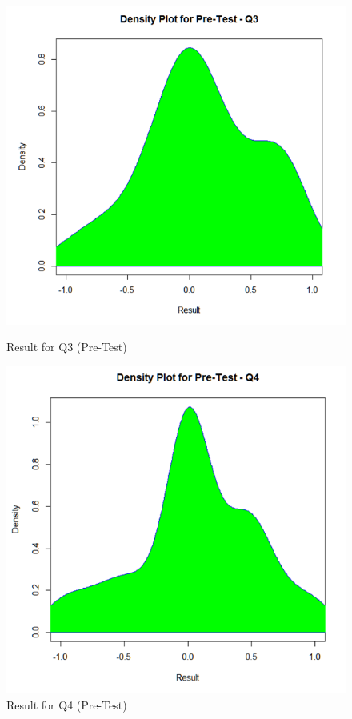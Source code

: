 \begin{figure}
	\begin{minipage}{.5\textwidth}
		\centering
		\includegraphics[width=1\linewidth]{figures/Pretest_q3}
		\caption{Result for Q3 (Pre-Test)}
		\label{fig:Pretest_q3}
	\end{minipage}%
	\begin{minipage}{.5\textwidth}
		\centering
		\includegraphics[width=1\linewidth]{figures/Pretest_q4}
		\caption{Result for Q4 (Pre-Test)}
		\label{fig:Pretest_q4}
	\end{minipage}
\end{figure}

